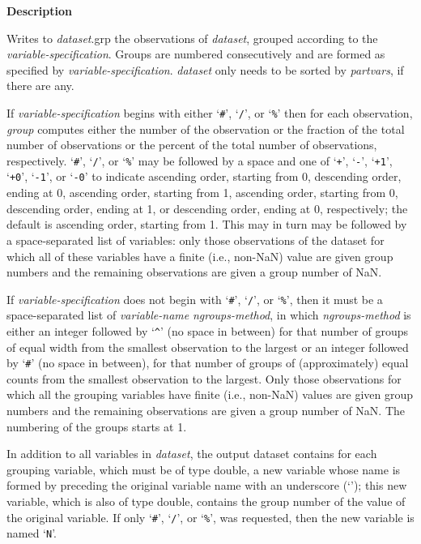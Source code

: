 \documentclass{book}
\newcommand\Texinfocommandstyletextvar[1]{{\normalfont{}\textsl{#1}}}%
\renewcommand{\_}{\Texinfounderscore\discretionary{}{}{}}
\begin{document}
\noindent{}\textbf{Description}

Writes to \Texinfocommandstyletextvar{dataset}.grp the observations of \Texinfocommandstyletextvar{dataset},
grouped according to the \Texinfocommandstyletextvar{variable-specification}.
Groups are numbered consecutively and are formed as specified by
\Texinfocommandstyletextvar{variable-specification}. \Texinfocommandstyletextvar{dataset} only needs to be
sorted by \Texinfocommandstyletextvar{partvars}, if there are any.

If \Texinfocommandstyletextvar{variable-specification} begins with either `\texttt{\#}', `\texttt{/}',
or `\texttt{\%}' then for each observation,
\Texinfocommandstyletextvar{group} computes either the number of the observation or
the fraction of the total number of observations or
the percent of the total number of observations, respectively.
`\texttt{\#}', `\texttt{/}', or `\texttt{\%}' may be followed by a space and one of
`\texttt{+}', `\texttt{-}', `\texttt{+1}', `\texttt{+0}', `\texttt{-1}', or `\texttt{-0}'
to indicate ascending order, starting from 0,
descending order, ending at 0,
ascending order, starting from 1,
ascending order, starting from 0,
descending order, ending at 1, or
descending order, ending at 0, respectively;
the default is ascending order, starting from 1.
This may in turn may be followed by a space-separated list of variables:
only those observations of the dataset for which all of these variables have
a finite (i.e., non-NaN) value are given group numbers and the remaining observations
are given a group number of NaN.

If \Texinfocommandstyletextvar{variable-specification} does not begin with
`\texttt{\#}', `\texttt{/}', or `\texttt{\%}', then it must be a space-separated list of
\Texinfocommandstyletextvar{variable-name} \Texinfocommandstyletextvar{ngroups-method}, in which
\Texinfocommandstyletextvar{ngroups-method} is either an integer followed by `\texttt{\^{}}' (no space in between)
for that number of groups
of equal width from the smallest observation to the largest or
an integer followed by
`\texttt{\#}' (no space in between), for that number of groups
of (approximately) equal counts from the smallest observation to the largest.
Only those observations for which all the grouping variables have finite
(i.e., non-NaN) values are given group numbers and the
remaining observations are given a group number of NaN.
The numbering of the groups starts at 1.

In addition to all variables in \Texinfocommandstyletextvar{dataset}, the output dataset contains
for each grouping variable, which must be of type double,
a new variable whose
name is formed by preceding the original variable name with an
underscore (`\texttt{\_}');
this new variable, which is also of type double,
contains the group number of the value of the original variable.
If only `\texttt{\#}', `\texttt{/}', or
`\texttt{\%}',
was requested, then the new variable is named `\texttt{\_N\_}'.
\end{document}
